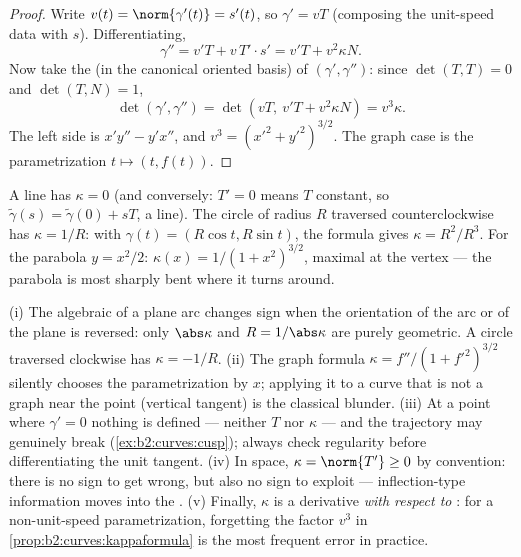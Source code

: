 \begin{proof}
Write $v(t) = \norm{\gamma'(t)} = s'(t)$, so $\gamma' = vT$
(composing the unit-speed data with $s$). Differentiating,
\[
\gamma'' = v'T + v\,T'\cdot s' = v'T + v^2\kappa N .
\]
Now take the  (in the canonical oriented basis) of
$(\gamma', \gamma'')$: since $\det(T, T) = 0$ and $\det(T, N) = 1$,
\[
\det(\gamma', \gamma'') = \det(vT,\ v'T + v^2\kappa N)
= v^3\kappa .
\]
The left side is $x'y'' - y'x''$, and $v^3 = (x'^2 +
y'^2)^{3/2}$. The graph case is the parametrization $t \mapsto (t,
f(t))$.
\end{proof}

\begin{example}\label{ex:b2:curves:kappaexamples}
A line has $\kappa = 0$ (and conversely: $T' = 0$ means $T$
constant, so $\tilde\gamma(s) = \tilde\gamma(0) + sT$, a line). The
circle of radius $R$ traversed counterclockwise has $\kappa = 1/R$:
with $\gamma(t) = (R\cos t, R\sin t)$, the formula gives $\kappa =
R^2/R^3$. For the parabola $y = x^2/2$: $\kappa(x) = 1/(1 +
x^2)^{3/2}$, maximal at the vertex --- the parabola is most sharply
bent where it turns around.
\end{example}

\begin{remark}
(i) The algebraic  of a plane arc changes sign when
the orientation of the arc or of the plane is reversed: only
$\abs\kappa$ and $R = 1/\abs\kappa$ are purely geometric. A
circle traversed clockwise has $\kappa = -1/R$. (ii) The
graph formula $\kappa = f''/(1 + f'^2)^{3/2}$ silently
chooses the parametrization by $x$; applying it to a curve
that is not a graph near the point (vertical tangent) is the
classical blunder. (iii) At a point where $\gamma' = 0$
nothing is defined --- neither $T$ nor $\kappa$ --- and the
trajectory may genuinely break
(\cref{ex:b2:curves:cusp}); always check regularity before
differentiating the unit tangent. (iv) In space, $\kappa =
\norm{T'} \geq 0$ by convention: there is no sign to get
wrong, but also no sign to exploit --- inflection-type
information moves into the . (v) Finally, $\kappa$ is
a derivative \emph{with respect to }: for a
non-unit-speed parametrization, forgetting the factor $v^3$
in \cref{prop:b2:curves:kappaformula} is the most frequent
error in practice.
\end{remark}

